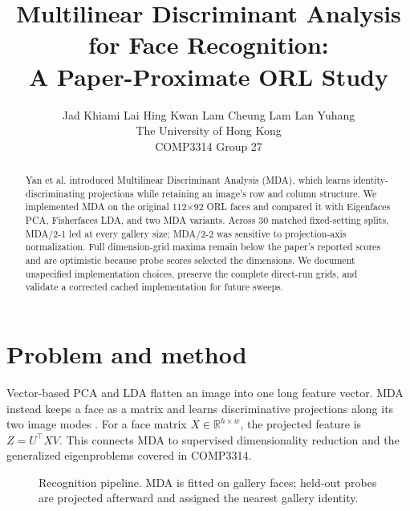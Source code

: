 \documentclass{article}
\title{Multilinear Discriminant Analysis for Face Recognition:\\A Paper-Proximate ORL Study}
\author{Jad Khiami \quad Lai Hing Kwan \quad Lam Cheung Lam \quad Lan Yuhang\\
The University of Hong Kong\\
COMP3314 Group 27}
\begin{document}
\maketitle

\begin{abstract}
Yan et al. introduced Multilinear Discriminant Analysis (MDA), which learns identity-discriminating projections while retaining an image's row and column structure. We implemented MDA on the original 112$\times$92 ORL faces and compared it with Eigenfaces PCA, Fisherfaces LDA, and two MDA variants. Across 30 matched fixed-setting splits, MDA/2-1 led at every gallery size; MDA/2-2 was sensitive to projection-axis normalization. Full dimension-grid maxima remain below the paper's reported scores and are optimistic because probe scores selected the dimensions. We document unspecified implementation choices, preserve the complete direct-run grids, and validate a corrected cached implementation for future sweeps.
\end{abstract}

\section{Problem and method}
Vector-based PCA and LDA flatten an image into one long feature vector. MDA instead keeps a face as a matrix and learns discriminative projections along its two image modes \citep{Yan2007MDA}. For a face matrix $X\in\mathbb{R}^{h\times w}$, the projected feature is $Z=U^\top X V$. This connects MDA to supervised dimensionality reduction and the generalized eigenproblems covered in COMP3314.

\begin{figure}[H]
\centering
{}
\caption{Recognition pipeline. MDA is fitted on gallery faces; held-out probes are projected afterward and assigned the nearest gallery identity.}
\label{fig:pipeline}
\end{figure}
\end{document}
